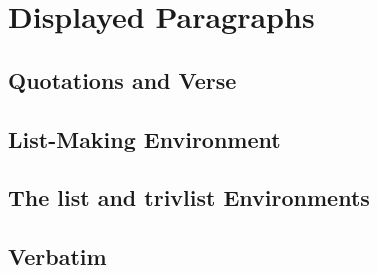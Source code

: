 \section{Displayed Paragraphs}
\subsection{Quotations and Verse}


\subsection{List-Making Environment}


\subsection{The list and trivlist Environments}


\subsection{Verbatim}